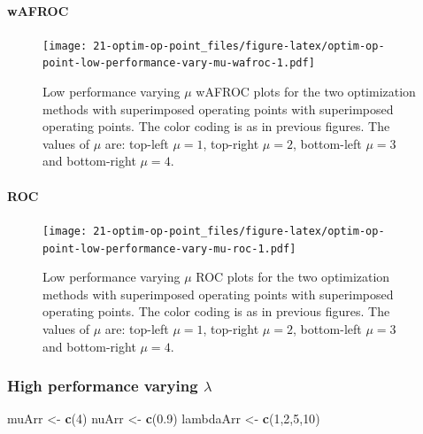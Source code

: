 \documentclass[
]{book}
\newenvironment{Shaded}{\begin{snugshade}}{\end{snugshade}}
\newcommand{\DecValTok}[1]{\textcolor[rgb]{0.00,0.00,0.81}{#1}}
\newcommand{\FloatTok}[1]{\textcolor[rgb]{0.00,0.00,0.81}{#1}}
\newcommand{\KeywordTok}[1]{\textcolor[rgb]{0.13,0.29,0.53}{\textbf{#1}}}
\newcommand{\NormalTok}[1]{#1}
\newcommand{\StringTok}[1]{\textcolor[rgb]{0.31,0.60,0.02}{#1}}
\begin{document}
\hypertarget{wafroc-6}{%
\paragraph{wAFROC}\label{wafroc-6}}

\begin{figure}
\centering
\texttt{[image: 21-optim-op-point\_files/figure-latex/optim-op-point-low-performance-vary-mu-wafroc-1.pdf]}
\caption{\label{fig:optim-op-point-low-performance-vary-mu-wafroc}Low performance varying \(\mu\) wAFROC plots for the two optimization methods with superimposed operating points with superimposed operating points. The color coding is as in previous figures. The values of \(\mu\) are: top-left \(\mu = 1\), top-right \(\mu = 2\), bottom-left \(\mu = 3\) and bottom-right \(\mu = 4\).}
\end{figure}

\hypertarget{roc-6}{%
\paragraph{ROC}\label{roc-6}}

\begin{figure}
\centering
\texttt{[image: 21-optim-op-point\_files/figure-latex/optim-op-point-low-performance-vary-mu-roc-1.pdf]}
\caption{\label{fig:optim-op-point-low-performance-vary-mu-roc}Low performance varying \(\mu\) ROC plots for the two optimization methods with superimposed operating points with superimposed operating points. The color coding is as in previous figures. The values of \(\mu\) are: top-left \(\mu = 1\), top-right \(\mu = 2\), bottom-left \(\mu = 3\) and bottom-right \(\mu = 4\).}
\end{figure}

\hypertarget{optim-op-point-high-performance-vary-lambda}{%
\subsubsection{\texorpdfstring{High performance varying \(\lambda\)}{High performance varying \textbackslash lambda}}\label{optim-op-point-high-performance-vary-lambda}}

\begin{Shaded}
\begin{Highlighting}[]
\NormalTok{muArr <-}\StringTok{ }\KeywordTok{c}\NormalTok{(}\DecValTok{4}\NormalTok{)}
\NormalTok{nuArr <-}\StringTok{ }\KeywordTok{c}\NormalTok{(}\FloatTok{0.9}\NormalTok{)}
\NormalTok{lambdaArr <-}\StringTok{ }\KeywordTok{c}\NormalTok{(}\DecValTok{1}\NormalTok{,}\DecValTok{2}\NormalTok{,}\DecValTok{5}\NormalTok{,}\DecValTok{10}\NormalTok{)}
\end{Highlighting}
\end{Shaded}
\end{document}
